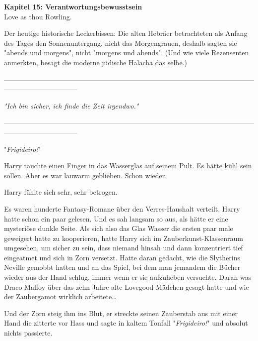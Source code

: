 

\hypertarget{verantwortungsbewusstsein}{%

\textbf{Kapitel 15: Verantwortungsbewusstsein}\\

Love as thou Rowling.

Der heutige historische Leckerbissen: Die alten Hebräer betrachteten als Anfang des Tages den Sonnenuntergang, nicht das Morgengrauen, deshalb sagten sie "abends und morgens", nicht "morgens und abends". (Und wie viele Rezensenten anmerkten, besagt die moderne jüdische Halacha das selbe.)

--------------------------------------------------------------------------------------------------------------------------------------------

\emph{"Ich bin sicher, ich finde die Zeit irgendwo."}

--------------------------------------------------------------------------------------------------------------------------------------------

"\emph{Frigideiro!}"

Harry tauchte einen Finger in das Wasserglas auf seinem Pult. Es hätte kühl sein sollen. Aber es war lauwarm geblieben. Schon wieder.

Harry fühlte sich sehr, sehr betrogen.

Es waren hunderte Fantasy-Romane über den Verres-Haushalt verteilt. Harry hatte schon ein paar gelesen. Und es sah langsam so aus, als hätte er eine mysteriöse dunkle Seite. Als sich also das Glas Wasser die ersten paar male geweigert hatte zu kooperieren, hatte Harry sich im Zauberkunst-Klassenraum umgesehen, um sicher zu sein, dass niemand hinsah und dann konzentriert tief eingeatmet und sich in Zorn versetzt. Hatte daran gedacht, wie die Slytherins Neville gemobbt hatten und an das Spiel, bei dem man jemandem die Bücher wieder aus der Hand schlug, immer wenn er sie aufzuheben versuchte. Daran was Draco Malfoy über das zehn Jahre alte Lovegood-Mädchen gesagt hatte und wie der Zaubergamot wirklich arbeitete…

Und der Zorn steig ihm ins Blut, er streckte seinen Zauberstab aus mit einer Hand die zitterte vor Hass und sagte in kaltem Tonfall "\emph{Frigideiro!}" und absolut nichts passierte.

}

